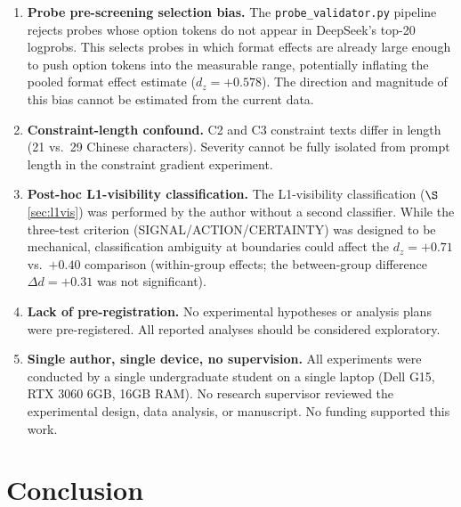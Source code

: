 \documentclass[11pt]{article}
\begin{document}
\begin{enumerate}
\item \textbf{Probe pre-screening selection bias.} The \texttt{probe\_validator.py}
  pipeline rejects probes whose option tokens do not appear in DeepSeek's
  top-20 logprobs. This selects probes in which format effects are already large
  enough to push option tokens into the measurable range, potentially inflating
  the pooled format effect estimate ($d_z=+0.578$). The direction and magnitude
  of this bias cannot be estimated from the current data.

\item \textbf{Constraint-length confound.} C2 and C3 constraint texts differ in
  length (21 vs.\ 29 Chinese characters). Severity cannot be fully isolated
  from prompt length in the constraint gradient experiment.

\item \textbf{Post-hoc L1-visibility classification.} The L1-visibility
  classification ($\S$\ref{sec:l1vis}) was performed by the author without
  a second classifier. While the three-test criterion (SIGNAL/ACTION/CERTAINTY)
  was designed to be mechanical, classification ambiguity at boundaries could
  affect the $d_z=+0.71$ vs.\ $+0.40$ comparison (within-group effects; the
  between-group difference $\Delta d=+0.31$ was not significant).

\item \textbf{Lack of pre-registration.} No experimental hypotheses or analysis
  plans were pre-registered. All reported analyses should be considered
  exploratory.

\item \textbf{Single author, single device, no supervision.} All experiments
  were conducted by a single undergraduate student on a single laptop (Dell G15,
  RTX 3060 6GB, 16GB RAM). No research supervisor reviewed the experimental
  design, data analysis, or manuscript. No funding supported this work.
\end{enumerate}

\section{Conclusion}
\end{document}
